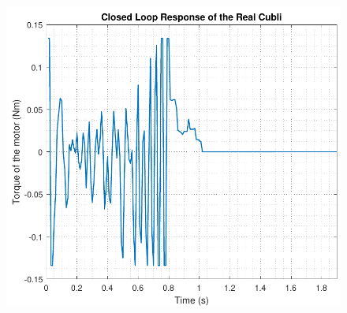 \\
\begin{figure}[H]\vspace{-4mm}
	\centering
	\includegraphics[scale=.53]{figures/torqueTestTustinPre}
	\label{torqueTestTustinPre}
\end{figure}\vspace{-5mm}


